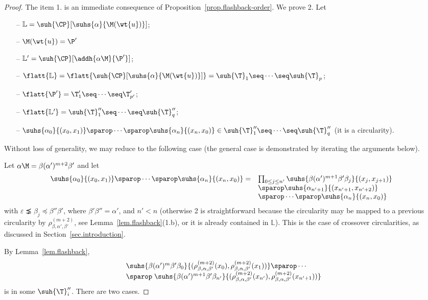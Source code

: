 \begin{proof}
The item 1. is an immediate consequence of Proposition~\ref{prop.flashback-order}.
We prove 2.  
Let
\begin{itemize}
\item[--]
$\mathbb{L} =  \suh{\CP}[\suhs{\alpha}{\M(\wt{u})} ]$;
 
\item[--]
$\M(\wt{u}) = \P'$

\item[--]
$\mathbb{L}' = \suh{\CP}[\addh{\alpha\M}{\P'}]$; 

\item[--]
$\flatt{\mathbb{L}}=\flatt{\suh{\CP}[\suhs{\alpha}{\M(\wt{u})} ]}=\suh{\T}_1\seq\cdots\seq\suh{\T}_p$;

\item[--]
$\flatt{\P'} = \T'_1\seq \cdots \seq \T_{p'}'$;

\item[--]
$\flatt{\mathbb{L}'}
= \suh{\T}_1''\seq\cdots\seq\suh{\T}_q''$;

\item[--]
$\suhs{\alpha_0}{(x_0,x_1)} \sparop \cdots \sparop
\suhs{\alpha_n}{(x_n,x_0)} \in \suh{\T}_1''\seq\cdots\seq\suh{\T}_q''$ 
 (it is a circularity).
\end{itemize}
Without loss of generality, we may reduce to the following case (the general case
is demonstrated by iterating the arguments below).

Let $\alpha \M = \beta (\alpha')^{m+2}\beta'$ and let 
\[
\begin{array}{@{\!}rl}
\suhs{\alpha_0}{(x_0,x_1)} \sparop \cdots \sparop
\suhs{\alpha_n}{(x_n,x_0)} =  &
\prod_{0 \leq j \leq n'} \suhs{\beta(\alpha')^{m+1}\beta'\beta_j}{(x_j, x_{j+1})}
\\
& \sparop \suhs{\alpha_{n'+1}}{(x_{n'+1}, x_{n'+2})}
\\
& \sparop \cdots \sparop
\suhs{\alpha_n}{(x_n,x_0)}
\end{array}
\] 
with $\varepsilon \precneq \beta_j \preceq \beta''\beta'$, where $\beta'\beta'' = \alpha'$, and $n'<n$
(otherwise 2 is straightforward because the circularity may be mapped
to a previous circularity by $\rho_{\beta,\alpha',\beta'}^{(m+2)}$, see Lemma~\ref{lem.flashback}(1.b), or it
is already contained in $\mathbb{L}$). This is the case of crossover circularities, as discussed in Section~\ref{sec.introduction}.

By Lemma~\ref{lem.flashback}, 
\begin{eqnarray}
\label{eq.lemma}
\begin{array}{l}
\suhs{\beta (\alpha')^{m}\beta'\beta_0}{(\rho_{\beta,\alpha,\beta'}^{(m+2)}(x_0), 
\rho_{\beta,\alpha,\beta'}^{(m+2)}(x_{1}))} \sparop  \cdots  
\\
\sparop \;
\suhs{\beta (\alpha')^{m+1}\beta'\beta_{n'}}{
(\rho_{\beta,\alpha,\beta'}^{(m+2)}(x_{n'}), 
\rho_{\beta,\alpha,\beta'}^{(m+2)}(x_{n'+1}))}
\end{array}
\end{eqnarray}
is in some $\suh{\T}_{i}''$. There are two cases.


\end{proof}
